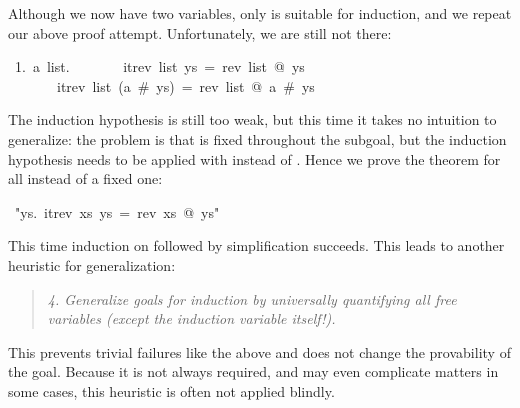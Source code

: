 \begin{isabelle}
\begin{isamarkuptxt}
Although we now have two variables, only  is suitable for
induction, and we repeat our above proof attempt. Unfortunately, we are still
not there:
\begin{isabellepar}%
~1.~{\isasymAnd}a~list.\isanewline
~~~~~~~itrev~list~ys~=~rev~list~@~ys~{\isasymLongrightarrow}\isanewline
~~~~~~~itrev~list~(a~\#~ys)~=~rev~list~@~a~\#~ys%
\end{isabellepar}%
The induction hypothesis is still too weak, but this time it takes no
intuition to generalize: the problem is that  is fixed throughout
the subgoal, but the induction hypothesis needs to be applied with
 instead of . Hence we prove the theorem
for all  instead of a fixed one:%
\end{isamarkuptxt}%
~{"}{\isasymforall}ys.~itrev~xs~ys~=~rev~xs~@~ys{"}%
\begin{isamarkuptxt}%
\noindent
This time induction on  followed by simplification succeeds. This
leads to another heuristic for generalization:
\begin{quote}
{\em 4. Generalize goals for induction by universally quantifying all free
variables {\em(except the induction variable itself!)}.}
\end{quote}
This prevents trivial failures like the above and does not change the
provability of the goal. Because it is not always required, and may even
complicate matters in some cases, this heuristic is often not
applied blindly.%
\end{isamarkuptxt}%
\end{isabelle}%
